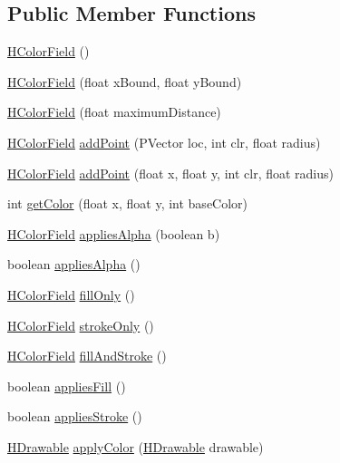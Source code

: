 \subsection*{Public Member Functions}
\begin{DoxyCompactItemize}
\item 
\hyperlink{classhype_1_1colorist_1_1_h_color_field_aa87f3f020dd4b494696e0a7922ea5b13}{H\-Color\-Field} ()
\item 
\hyperlink{classhype_1_1colorist_1_1_h_color_field_a4d9aeee6ae7f36dc74dbd6d60783ad2b}{H\-Color\-Field} (float x\-Bound, float y\-Bound)
\item 
\hyperlink{classhype_1_1colorist_1_1_h_color_field_a7cf00c369cc444b69a9ba01e81a2cfe2}{H\-Color\-Field} (float maximum\-Distance)
\item 
\hyperlink{classhype_1_1colorist_1_1_h_color_field}{H\-Color\-Field} \hyperlink{classhype_1_1colorist_1_1_h_color_field_aa7420b1c48ee67d00f60221259b435d3}{add\-Point} (P\-Vector loc, int clr, float radius)
\item 
\hyperlink{classhype_1_1colorist_1_1_h_color_field}{H\-Color\-Field} \hyperlink{classhype_1_1colorist_1_1_h_color_field_a22631cf70898c465f84c928f93d2d3fd}{add\-Point} (float x, float y, int clr, float radius)
\item 
int \hyperlink{classhype_1_1colorist_1_1_h_color_field_af067697990b6499242ad756b3e55e253}{get\-Color} (float x, float y, int base\-Color)
\item 
\hyperlink{classhype_1_1colorist_1_1_h_color_field}{H\-Color\-Field} \hyperlink{classhype_1_1colorist_1_1_h_color_field_ae86c070c33668ac7ef6094e801c7b0c8}{applies\-Alpha} (boolean b)
\item 
boolean \hyperlink{classhype_1_1colorist_1_1_h_color_field_ae93ddcc1e07c7921bc5aa249f7af50e9}{applies\-Alpha} ()
\item 
\hyperlink{classhype_1_1colorist_1_1_h_color_field}{H\-Color\-Field} \hyperlink{classhype_1_1colorist_1_1_h_color_field_ac6553b106581afbedf61aa8ac8da30ed}{fill\-Only} ()
\item 
\hyperlink{classhype_1_1colorist_1_1_h_color_field}{H\-Color\-Field} \hyperlink{classhype_1_1colorist_1_1_h_color_field_a8de85f8b123d449c06b42bd9e8849523}{stroke\-Only} ()
\item 
\hyperlink{classhype_1_1colorist_1_1_h_color_field}{H\-Color\-Field} \hyperlink{classhype_1_1colorist_1_1_h_color_field_af8b807169ebbcce47a71c0192217fbea}{fill\-And\-Stroke} ()
\item 
boolean \hyperlink{classhype_1_1colorist_1_1_h_color_field_aca61204b4b1541e37a9e8d46c7abeee4}{applies\-Fill} ()
\item 
boolean \hyperlink{classhype_1_1colorist_1_1_h_color_field_ae925f839b73a26464b8b0a5a0466c89e}{applies\-Stroke} ()
\item 
\hyperlink{classhype_1_1drawable_1_1_h_drawable}{H\-Drawable} \hyperlink{classhype_1_1colorist_1_1_h_color_field_aa1356a58a8aea022fa7e24a47a82e437}{apply\-Color} (\hyperlink{classhype_1_1drawable_1_1_h_drawable}{H\-Drawable} drawable)
\end{DoxyCompactItemize}
